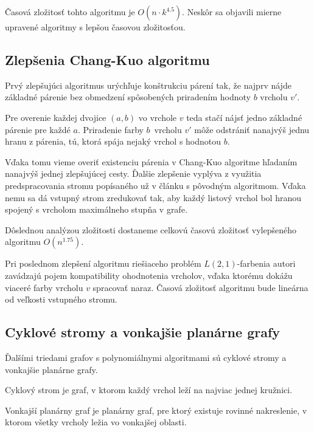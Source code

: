 Časová zložitosť tohto algoritmu je $O(n \cdot k^{4.5})$\cite{chang_kuo}. Neskôr sa objavili
mierne upravené algoritmy s lepšou časovou zložitosťou.

\subsection{Zlepšenia Chang-Kuo algoritmu}

Prvý zlepšujúci algoritmus urýchľuje konštrukciu
párení tak, že najprv nájde základné párenie bez obmedzení spôsobených priradením hodnoty $b$
vrcholu $v'$.

Pre overenie každej dvojice $(a,b)$ vo vrchole $v$ teda stačí nájsť jedno základné
párenie pre každé $a$. Priradenie farby $b$ vrcholu $v'$ môže odstrániť nanajvýš jednu hranu z párenia,
tú, ktorá spája nejaký vrchol s hodnotou $b$. 

Vďaka tomu vieme overiť existenciu párenia v Chang-Kuo algoritme hľadaním nanajvýš
jednej zlepšujúcej cesty. Ďalšie zlepšenie vyplýva z využitia predspracovania stromu popísaného
už v článku s pôvodným algoritmom. Vďaka nemu sa dá vstupný strom zredukovať tak, aby každý
listový vrchol bol hranou spojený s vrcholom maximálneho stupňa v grafe\cite{chang_kuo}.

Dôslednou analýzou 
zložitosti dostaneme celkovú časovú zložitosť vylepšeného algoritmu $O(n^{1.75})$\cite{chang_kuo_improv}.

Pri poslednom zlepšení algoritmu riešiaceho problém $L(2,1)$-farbenia autori zavádzajú
pojem kompatibility ohodnotenia vrcholov, vďaka ktorému dokážu viaceré farby vrcholu $v$
spracovať naraz. Časová zložitosť algoritmu bude lineárna od veľkosti vstupného stromu\cite{chang_kuo_linear}.

\subsection{Cyklové stromy a vonkajšie planárne grafy}

Ďalšími triedami grafov s polynomiálnymi algoritmami sú cyklové stromy\cite{kaktusy} a vonkajšie
planárne grafy\cite{outer_planar}.

\begin{defn}
    Cyklový strom je graf, v ktorom každý vrchol leží na najviac jednej kružnici.
\end{defn}

\begin{defn}
    Vonkajší planárny graf je planárny graf, pre ktorý existuje rovinné nakreslenie, v ktorom
    všetky vrcholy ležia vo vonkajšej oblasti.
\end{defn}

